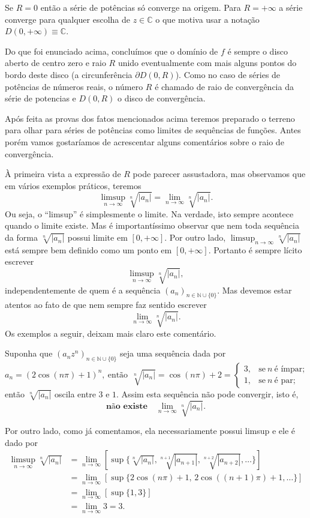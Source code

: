 Se $R=0$ então a série de potências só converge na origem. 
Para $R=+\infty$ a série converge para qualquer escolha de $z\in \mathbb{C}$
o que motiva usar a notação $D(0,+\infty)\equiv \mathbb{C}$.


\bigskip 
Do que foi enunciado acima, 
concluímos que o domínio de $f$ é sempre o disco aberto de centro zero 
e raio $R$ unido eventualmente 
com mais alguns pontos do bordo deste disco (a circunferência $\partial D(0,R)$).
Como no caso de séries de potências de números reais, o número $R$ 
é chamado de raio de convergência da série de potencias e $D(0,R)$
o disco de convergência.  

Após feita as provas dos fatos mencionados acima teremos preparado o 
terreno para olhar para séries de potências como limites de sequências
de funções. Antes porém vamos gostaríamos de acrescentar alguns comentários
sobre o raio de convergência. 



\bigskip

À primeira vista a expressão de $R$ pode parecer assustadora, mas
observamos que em vários exemplos práticos, teremos
\[
\limsup_{n\to\infty} \sqrt[n]{|a_n|} = \lim_{n\to\infty} \sqrt[n]{|a_n|}.
\]
Ou seja, o ``limsup'' é simplesmente o limite. 
Na verdade, isto sempre acontece quando o limite existe.
Mas é importantíssimo observar que nem toda sequência da forma $\sqrt[n]{|a_n|}$
possui limite em $[0,+\infty]$. 
Por outro lado, $\limsup_{n\to\infty} \sqrt[n]{|a_n|}$
está sempre bem definido como um ponto em $[0,+\infty]$. 
Portanto é sempre lícito escrever 
\[
\limsup_{n\to\infty} \sqrt[n]{|a_n|},
\]
independentemente de quem é a sequência  $(a_n)_{n\in\mathbb{N}\cup\{0\}}$.
Mas devemos estar atentos ao fato de que nem sempre faz sentido escrever 
\[
\lim_{n\to\infty} \sqrt[n]{|a_n|}.
\]
Os exemplos a seguir, deixam mais claro este comentário.

\bigskip 

Suponha que $(a_nz^n)_{n\in\mathbb{N}\cup\{0\}}$ seja uma sequência dada por 
\[
a_n 
= 
(2\cos(n\pi)+1)^n, 
\ \text{então}\ \ 
\sqrt[n]{|a_n|} 
=  
\cos(n\pi)+2
=
\begin{cases}
3,& \text{se}\ n \ \text{é ímpar}; 
\\
1,& \text{se}\ n \ \text{é par};  
\end{cases}
\]
então $\sqrt[n]{|a_n|}$ oscila entre $3$ e $1$. 
Assim esta sequência não pode convergir, isto é,
\[
\textbf{não existe} \quad \lim_{n\to\infty}\sqrt[n]{|a_n|}.
\]

Por outro lado, como já comentamos, ela necessariamente 
possui limsup e ele é dado por
\begin{align*}
\limsup_{n\to\infty}\sqrt[n]{|a_n|}
&=
\lim_{n\to\infty} 
\left[ \sup \Big\{ \sqrt[n]{|a_n|}, \sqrt[n+1]{|a_{n+1}|}, \sqrt[n+2]{|a_{n+2}|},\ldots  \Big\} \right]
\\
&=
\lim_{n\to\infty} \left[ \sup \Big\{ 2\cos(n\pi)+1,\, 2\cos((n+1)\pi)+1,\ldots  \Big\} \right]
\\
&=
\lim_{n\to\infty} [ \sup \{ 1,3 \} ]
\\
&=
\lim_{n\to\infty} 3 = 3.
\end{align*} 



